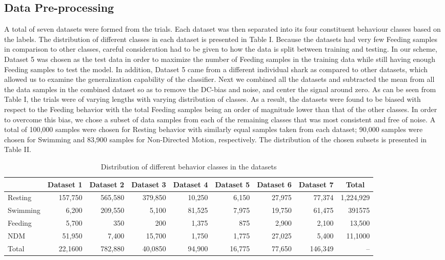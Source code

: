 \documentclass[conference]{IEEEtran}
\begin{document}
\subsection{Data Pre-processing}
A total of seven datasets were formed from the trials. Each dataset was then separated into its four constituent behaviour classes based on the labels. The distribution of different classes in each dataset is presented in Table I. Because the datasets had very few Feeding samples in comparison to other classes, careful consideration had to be given to how the data is split between training and testing. In our scheme, Dataset 5 was chosen as the test data in order to maximize the number of Feeding samples in the training data while still having enough Feeding samples to test the model.  In addition, Dataset 5 came from a different individual shark as compared to other datasets, which allowed us to examine the generalization capability of the classifier.
Next we combined all the datasets and subtracted the mean from all the data samples in the combined dataset so as to remove the DC-bias and noise, and center the signal around zero. 
As can be seen from Table I, the trials were of varying lengths with varying distribution of classes. As a result, the datasets were found to be biased with respect to the Feeding behavior with the total Feeding samples being an order of magnitude lower than that of the other classes. In order to overcome this bias, we chose a subset of data samples from each of the remaining classes that was most consistent and free of noise. A total of 100,000 samples were chosen for Resting behavior with similarly equal samples taken from each dataset; 90,000 samples were chosen for Swimming and 83,900 samples for Non-Directed Motion, respectively. The distribution of the chosen subsets is presented in Table II.
\begin{table}[tp!]
	\centering
	\caption{Distribution of different behavior classes in the datasets}
	\begin{tabular}{l r r r r r r r r}
	\hline
	& \textbf{Dataset 1} & \textbf{Dataset 2} & \textbf{Dataset 3} & \textbf{Dataset 4} & \textbf{Dataset 5} & \textbf{Dataset 6} & \textbf{Dataset 7} & \multicolumn{1}{c}{\textbf{Total}}\\
	\hline
	Resting & 157,750 & 565,580 & 379,850 & 10,250 & 6,150 & 27,975 & 77,374 & 1,224,929 \\
	Swimming & 6,200 & 209,550 & 5,100 & 81,525 & 7,975 & 19,750 & 61,475 & 391575 \\
	Feeding & 5,700 & 350 & 200 & 1,375 & 875 & 2,900 & 2,100 & 13,500 \\
	NDM & 51,950 & 7,400 & 15,700 & 1,750 & 1,775 & 27,025 & 5,400 & 11,1000 \\
	Total & 22,1600 & 782,880 & 40,0850 & 94,900 & 16,775 & 77,650 & 146,349 & -- \\
	\hline
	\end{tabular}
	\label{}
\end{table}
\end{document}
